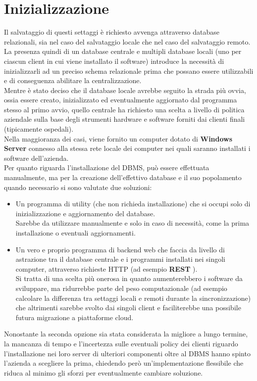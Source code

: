 \documentclass[\main/tesi.tex]{subfiles}
\begin{document}
\section{Inizializzazione}
Il salvataggio di questi settaggi è richiesto avvenga attraverso database relazionali, sia nel caso del salvataggio locale che nel caso del salvataggio remoto.\\
La presenza quindi di un database centrale e multipli database locali (uno per ciascun client in cui viene installato il software) introduce la necessità di inizializzarli ad un preciso schema relazionale prima che possano essere utilizzabili e di conseguenza abilitare la centralizzazione.\\
Mentre è stato deciso che il database locale avrebbe seguito la strada più ovvia, ossia essere creato, inizializzato ed eventualmente aggiornato dal programma stesso al primo avvio, quello centrale ha richiesto una scelta a livello di politica aziendale sulla base degli strumenti hardware e software forniti dai clienti finali (tipicamente ospedali).\\
Nella maggioranza dei casi, viene fornito un computer dotato di \textbf{Windows Server} \cite{windowsserver} connesso alla stessa rete locale dei computer nei quali saranno installati i software dell'azienda.\\
Per quanto riguarda l'installazione del DBMS, può essere effettuata manualmente, ma per la creazione dell'effettivo database e il suo popolamento quando necessario si sono valutate due soluzioni:
\begin{itemize}
    \item Un programma di utility (che non richieda installazione) che si occupi solo di inizializzazione e aggiornamento del database.\\Sarebbe da utilizzare manualmente e solo in caso di necessità, come la prima installazione o eventuali aggiornamenti.
    \item Un vero e proprio programma di backend web che faccia da livello di astrazione tra il database centrale e i programmi installati nei singoli computer, attraverso richieste HTTP (ad esempio \textbf{REST} \cite{rest}).\\Si tratta di una scelta più onerosa in quanto aumenterebbero i software da sviluppare, ma ridurrebbe parte del peso computazionale (ad esempio calcolare la differenza tra settaggi locali e remoti durante la sincronizzazione) che altrimenti sarebbe svolto dai singoli client e faciliterebbe una possibile futura migrazione a piattaforme cloud.
\end{itemize}
Nonostante la seconda opzione sia stata considerata la migliore a lungo termine, la mancanza di tempo e l'incertezza sulle eventuali policy dei clienti riguardo l'installazione nei loro server di ulteriori componenti oltre al DBMS hanno spinto l'azienda a scegliere la prima, chiedendo però un'implementazione flessibile che riduca al minimo gli sforzi per eventualmente cambiare soluzione.
\end{document}
